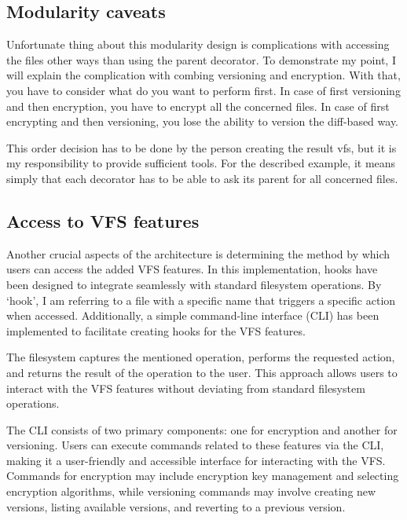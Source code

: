 \subsection{Modularity caveats}\label{subsec:modularity-cavs}

Unfortunate thing about this modularity design is complications with accessing the files other ways than using the parent decorator.
To demonstrate my point, I will explain the complication with combing versioning and encryption.
With that, you have to consider what do you want to perform first.
In case of first versioning and then encryption, you have to encrypt all the concerned files.
In case of first encrypting and then versioning, you lose the ability to version the diff-based way.

This order decision has to be done by the person creating the result vfs, but it is my responsibility to provide sufficient tools.
For the described example, it means simply that each decorator has to be able to ask its parent for all concerned files.

\subsection{Access to VFS features}\label{subsec:access-to-vfs-features}

Another crucial aspects of the architecture is determining the method by which users can access the added VFS features.
In this implementation, hooks have been designed to integrate seamlessly with standard filesystem operations.
By `hook', I am referring to a file with a specific name that triggers a specific action when accessed.
Additionally, a simple command-line interface (CLI) has been implemented to facilitate creating hooks for the VFS features.

The filesystem captures the mentioned operation, performs the requested action, and returns the result of the operation to the user.
This approach allows users to interact with the VFS features without deviating from standard filesystem operations.

The CLI consists of two primary components: one for encryption and another for versioning.
Users can execute commands related to these features via the CLI, making it a user-friendly and accessible interface for interacting with the VFS.
Commands for encryption may include encryption key management and selecting encryption algorithms, while versioning commands may involve creating new versions, listing available versions, and reverting to a previous version.

